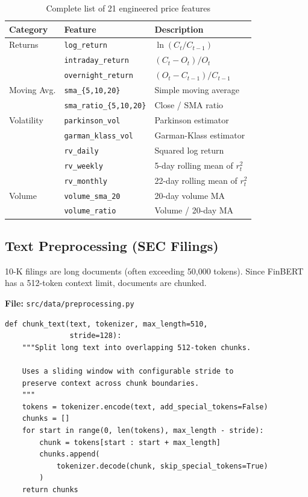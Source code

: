 \documentclass[12pt, a4paper]{article}
\begin{document}
\begin{table}[H]
\centering
\caption{Complete list of 21 engineered price features}
\small
\begin{tabular}{lll}
\toprule
\textbf{Category} & \textbf{Feature} & \textbf{Description} \\
\midrule
Returns & \texttt{log\_return} & $\ln(C_t / C_{t-1})$ \\
        & \texttt{intraday\_return} & $(C_t - O_t) / O_t$ \\
        & \texttt{overnight\_return} & $(O_t - C_{t-1}) / C_{t-1}$ \\
\midrule
Moving Avg. & \texttt{sma\_\{5,10,20\}} & Simple moving average \\
            & \texttt{sma\_ratio\_\{5,10,20\}} & Close / SMA ratio \\
\midrule
Volatility & \texttt{parkinson\_vol} & Parkinson estimator \\
           & \texttt{garman\_klass\_vol} & Garman-Klass estimator \\
           & \texttt{rv\_daily} & Squared log return \\
           & \texttt{rv\_weekly} & 5-day rolling mean of $r_t^2$ \\
           & \texttt{rv\_monthly} & 22-day rolling mean of $r_t^2$ \\
\midrule
Volume & \texttt{volume\_sma\_20} & 20-day volume MA \\
       & \texttt{volume\_ratio} & Volume / 20-day MA \\
\bottomrule
\end{tabular}
\end{table}


\subsection{Text Preprocessing (SEC Filings)}
\label{sec:text-preprocessing}

10-K filings are long documents (often exceeding 50,000 tokens).  Since FinBERT has a 512-token context limit, documents are chunked.

\noindent\textbf{File:} \texttt{src/data/preprocessing.py}

\begin{lstlisting}[caption={Text chunking for FinBERT}]
def chunk_text(text, tokenizer, max_length=510,
               stride=128):
    """Split long text into overlapping 512-token chunks.
    
    Uses a sliding window with configurable stride to
    preserve context across chunk boundaries.
    """
    tokens = tokenizer.encode(text, add_special_tokens=False)
    chunks = []
    for start in range(0, len(tokens), max_length - stride):
        chunk = tokens[start : start + max_length]
        chunks.append(
            tokenizer.decode(chunk, skip_special_tokens=True)
        )
    return chunks
\end{lstlisting}
\end{document}
